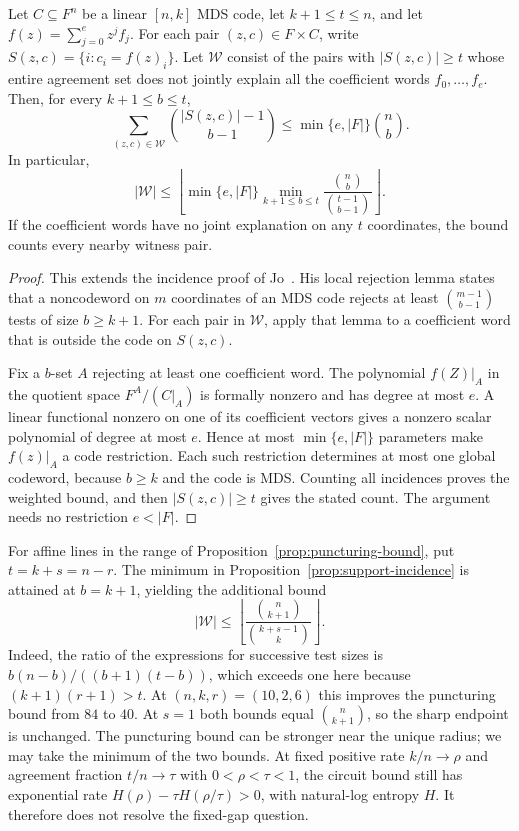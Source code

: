 \begin{proposition}
\label{prop:support-incidence}
Let $C\subseteq F^n$ be a linear $[n,k]$ MDS code, let
$k+1\le t\le n$, and let $f(z)=\sum_{j=0}^e z^j f_j$.
For each pair $(z,c)\in F\times C$, write
$S(z,c)=\{i:c_i=f(z)_i\}$. Let $\mathcal W$ consist of the
pairs with $|S(z,c)|\ge t$ whose entire agreement set does not
jointly explain all the coefficient words $f_0,\ldots,f_e$.
Then, for every $k+1\le b\le t$,
\[
 \sum_{(z,c)\in\mathcal W}\binom{|S(z,c)|-1}{b-1}
 \le \min\{e,|F|\}\binom nb.
\]
In particular,
\[
 |\mathcal W|\le
 \left\lfloor\min\{e,|F|\}
 \min_{k+1\le b\le t}\frac{\binom nb}{\binom{t-1}{b-1}}
 \right\rfloor.
\]
If the coefficient words have no joint explanation on any $t$
coordinates, the bound counts every nearby witness pair.
\end{proposition}
\begin{proof}
This extends the incidence proof of Jo~\cite[Lemma~4.1 and
Theorem~4.2]{jo-mca}. His local rejection lemma states that a
noncodeword on $m$ coordinates of an MDS code rejects at least
$\binom{m-1}{b-1}$ tests of size $b\ge k+1$.
For each pair in $\mathcal W$, apply that lemma to a coefficient
word that is outside the code on $S(z,c)$.

Fix a $b$-set $A$ rejecting at least one coefficient word. The
polynomial $f(Z)|_A$ in the quotient space $F^A/(C|_A)$ is
formally nonzero and has degree at most $e$. A linear functional
nonzero on one of its coefficient vectors gives a nonzero scalar
polynomial of degree at most $e$. Hence at most
$\min\{e,|F|\}$ parameters make $f(z)|_A$ a code restriction.
Each such restriction determines at most one global codeword,
because $b\ge k$ and the code is MDS. Counting all incidences
proves the weighted bound, and then $|S(z,c)|\ge t$ gives the
stated count. The argument needs no restriction $e<|F|$.
\end{proof}

For affine lines in the range of
Proposition~\ref{prop:puncturing-bound}, put $t=k+s=n-r$.
The minimum in Proposition~\ref{prop:support-incidence} is
attained at $b=k+1$, yielding the additional bound
\[
 |\mathcal W|\le
 \left\lfloor\frac{\binom n{k+1}}{\binom{k+s-1}{k}}\right\rfloor.
\]
Indeed, the ratio of the expressions for successive test sizes is
$b(n-b)/((b+1)(t-b))$, which exceeds one here because
$(k+1)(r+1)>t$. At $(n,k,r)=(10,2,6)$ this improves the puncturing
bound from $84$ to $40$. At $s=1$ both bounds equal
$\binom n{k+1}$, so the sharp endpoint is unchanged.
The puncturing bound can be stronger near the unique radius;
we may take the minimum of the two bounds. At fixed positive rate
$k/n\to\rho$ and agreement fraction $t/n\to\tau$ with
$0<\rho<\tau<1$, the circuit bound still has exponential rate
$H(\rho)-\tau H(\rho/\tau)>0$, with natural-log entropy $H$.
It therefore does not resolve the fixed-gap question.

